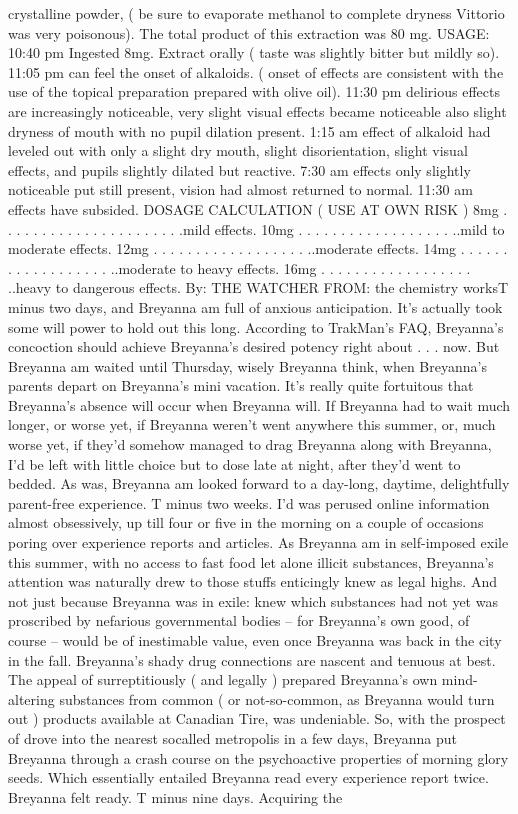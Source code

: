 \documentclass[12pt]{book}
\begin{document}
crystalline powder, ( be sure to evaporate methanol to complete dryness Vittorio was very poisonous). The total product of this extraction was 80 mg. USAGE: 10:40 pm Ingested 8mg. Extract orally ( taste was slightly bitter but mildly so). 11:05 pm can feel the onset of alkaloids. ( onset of effects are consistent with the use of the topical preparation prepared with olive oil). 11:30 pm delirious effects are increasingly noticeable, very slight visual effects became noticeable also slight dryness of mouth with no pupil dilation present. 1:15 am effect of alkaloid had leveled out with only a slight dry mouth, slight disorientation, slight visual effects, and pupils slightly dilated but reactive. 7:30 am effects only slightly noticeable put still present, vision had almost returned to normal. 11:30 am effects have subsided. DOSAGE CALCULATION ( USE AT OWN RISK ) 8mg . . .   . . .   . . .   . . .   . . .   . . .   . . .  .mild effects. 10mg . . .   . . .   . . .   . . .   . . .   . . .  ..mild to moderate effects. 12mg . . .   . . .   . . .   . . .   . . .   . . .  ..moderate effects. 14mg . . .   . . .   . . .   . . .   . . .   . . .  ..moderate to heavy effects. 16mg . . .   . . .   . . .   . . .   . . .   . . .  ..heavy to dangerous effects. By: THE WATCHER FROM: the chemistry worksT minus two days, and Breyanna am full of anxious anticipation. It's actually took some will power to hold out this long. According to TrakMan's FAQ, Breyanna's concoction should achieve Breyanna's desired potency right about  . . .  now. But Breyanna am waited until Thursday, wisely Breyanna think, when Breyanna's parents depart on Breyanna's mini vacation. It's really quite fortuitous that Breyanna's absence will occur when Breyanna will. If Breyanna had to wait much longer, or worse yet, if Breyanna weren't went anywhere this summer, or, much worse yet, if they'd somehow managed to drag Breyanna along with Breyanna, I'd be left with little choice but to dose late at night, after they'd went to bedded. As was, Breyanna am looked forward to a day-long, daytime, delightfully parent-free experience. T minus two weeks. I'd was perused online information almost obsessively, up till four or five in the morning on a couple of occasions poring over experience reports and articles. As Breyanna am in self-imposed exile this summer, with no access to fast food let alone illicit substances, Breyanna's attention was naturally drew to those stuffs enticingly knew as legal highs. And not just because Breyanna was in exile: knew which substances had not yet was proscribed by nefarious governmental bodies -- for Breyanna's own good, of course -- would be of inestimable value, even once Breyanna was back in the city in the fall. Breyanna's shady drug connections are nascent and tenuous at best. The appeal of surreptitiously ( and legally ) prepared Breyanna's own mind-altering substances from common ( or not-so-common, as Breyanna would turn out ) products available at Canadian Tire, was undeniable. So, with the prospect of drove into the nearest socalled metropolis in a few days, Breyanna put Breyanna through a crash course on the psychoactive properties of morning glory seeds. Which essentially entailed Breyanna read every experience report twice. Breyanna felt ready. T minus nine days. Acquiring the 
\end{document}

